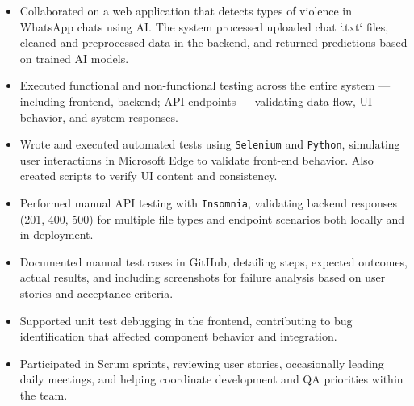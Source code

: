 \documentclass[11pt,a4paper]{article}
\begin{document}
\begin{itemize}
    \item Collaborated on a web application that detects types of violence 
    in WhatsApp chats using AI. The system processed uploaded chat `.txt` files, 
    cleaned and preprocessed data in the backend, and returned predictions based on trained AI models.
    
    \item Executed functional and non-functional testing across the entire system — including 
    frontend, backend; API endpoints — validating data flow, UI behavior, and system responses.

    \item Wrote and executed automated tests using \texttt{Selenium} and \texttt{Python}, 
    simulating user interactions in Microsoft Edge to validate front-end behavior. Also created 
    scripts to verify UI content and consistency.

    \item Performed manual API testing with \texttt{Insomnia}, validating backend responses 
    (201, 400, 500) for multiple file types and endpoint scenarios both locally and in deployment.

    \item Documented manual test cases in GitHub, detailing steps, expected outcomes, actual results, 
    and including screenshots for failure analysis based on user stories and acceptance criteria.

    \item Supported unit test debugging in the frontend, contributing to bug 
    identification that affected component behavior and integration.

    \item Participated in Scrum sprints, reviewing user stories, occasionally leading daily meetings, 
    and helping coordinate development and QA priorities within the team.

\end{itemize}
\end{document}
